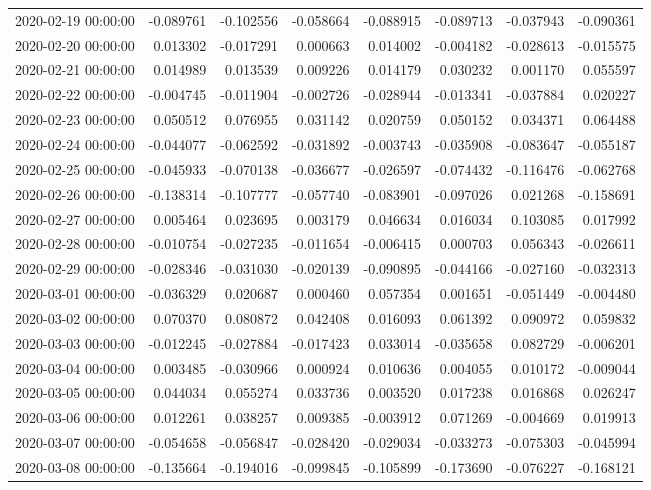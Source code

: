 \begin{tabular}{lrrrrrrr}
2020-02-19 00:00:00 & -0.089761 & -0.102556 & -0.058664 & -0.088915 & -0.089713 & -0.037943 & -0.090361 \\
2020-02-20 00:00:00 & 0.013302 & -0.017291 & 0.000663 & 0.014002 & -0.004182 & -0.028613 & -0.015575 \\
2020-02-21 00:00:00 & 0.014989 & 0.013539 & 0.009226 & 0.014179 & 0.030232 & 0.001170 & 0.055597 \\
2020-02-22 00:00:00 & -0.004745 & -0.011904 & -0.002726 & -0.028944 & -0.013341 & -0.037884 & 0.020227 \\
2020-02-23 00:00:00 & 0.050512 & 0.076955 & 0.031142 & 0.020759 & 0.050152 & 0.034371 & 0.064488 \\
2020-02-24 00:00:00 & -0.044077 & -0.062592 & -0.031892 & -0.003743 & -0.035908 & -0.083647 & -0.055187 \\
2020-02-25 00:00:00 & -0.045933 & -0.070138 & -0.036677 & -0.026597 & -0.074432 & -0.116476 & -0.062768 \\
2020-02-26 00:00:00 & -0.138314 & -0.107777 & -0.057740 & -0.083901 & -0.097026 & 0.021268 & -0.158691 \\
2020-02-27 00:00:00 & 0.005464 & 0.023695 & 0.003179 & 0.046634 & 0.016034 & 0.103085 & 0.017992 \\
2020-02-28 00:00:00 & -0.010754 & -0.027235 & -0.011654 & -0.006415 & 0.000703 & 0.056343 & -0.026611 \\
2020-02-29 00:00:00 & -0.028346 & -0.031030 & -0.020139 & -0.090895 & -0.044166 & -0.027160 & -0.032313 \\
2020-03-01 00:00:00 & -0.036329 & 0.020687 & 0.000460 & 0.057354 & 0.001651 & -0.051449 & -0.004480 \\
2020-03-02 00:00:00 & 0.070370 & 0.080872 & 0.042408 & 0.016093 & 0.061392 & 0.090972 & 0.059832 \\
2020-03-03 00:00:00 & -0.012245 & -0.027884 & -0.017423 & 0.033014 & -0.035658 & 0.082729 & -0.006201 \\
2020-03-04 00:00:00 & 0.003485 & -0.030966 & 0.000924 & 0.010636 & 0.004055 & 0.010172 & -0.009044 \\
2020-03-05 00:00:00 & 0.044034 & 0.055274 & 0.033736 & 0.003520 & 0.017238 & 0.016868 & 0.026247 \\
2020-03-06 00:00:00 & 0.012261 & 0.038257 & 0.009385 & -0.003912 & 0.071269 & -0.004669 & 0.019913 \\
2020-03-07 00:00:00 & -0.054658 & -0.056847 & -0.028420 & -0.029034 & -0.033273 & -0.075303 & -0.045994 \\
2020-03-08 00:00:00 & -0.135664 & -0.194016 & -0.099845 & -0.105899 & -0.173690 & -0.076227 & -0.168121 \\

\end{tabular}
